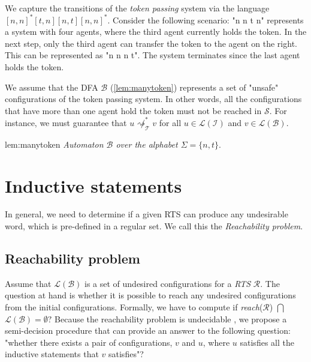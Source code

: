 \paragraph*{}
We capture the transitions of the \textit{token passing} system via the language 
$[n,n]^*[t,n][n,t][n,n]^*$.
Consider the following scenario: "n n t n" represents a system with four agents, 
where the third agent currently holds the token. In the next step, 
only the third agent can transfer the token to the agent on the right. 
This can be represented as "n n n t". The system terminates since the last agent 
holds the token.

We assume that the DFA $\mathcal{B}$ (\ref{lem:manytoken}) represents a set of "unsafe" configurations of the token passing system.
In other words, all the configurations that have more than one agent hold the token must not be reached in $\mathcal{S}$. 
For instance, we must guarantee that $u \not\rightsquigarrow_\mathcal{T}^{*} v$ for all $u \in \mathcal{L}(\mathcal{I})$ and $v \in \mathcal{L}(\mathcal{B})$.
\newpage
\begin{lem}{lem:manytoken}
    \textit{Automaton $\mathcal{B}$ over the alphabet $\Sigma = \{n,t\}$}.\\
\end{lem}

\section{Inductive statements}\label{section:inductive_statements}
In general, we need to determine if a given RTS can produce any undesirable word,
which is pre-defined in a regular set.
We call this the \textit{Reachability problem}.
\subsection*{Reachability problem}
Assume that $\mathcal{L}(\mathcal{B})$ is a set of undesired configurations for a \textit{RTS} $\mathcal{R}$.
The question at hand is whether it is possible to reach any undesired configurations from the initial configurations.
Formally, we have to compute
if \textit{reach}($\mathcal{R}$) $\bigcap$ $\mathcal{L}(\mathcal{B}) = \emptyset?$
Because the reachability problem is undecidable \cite{bloem2016decidability}, we propose a semi-decision procedure that can provide an answer to the following question:
"whether there exists a pair of configurations, $v$ and $u$, 
where $u$ satisfies all the inductive statements that $v$ satisfies"?

